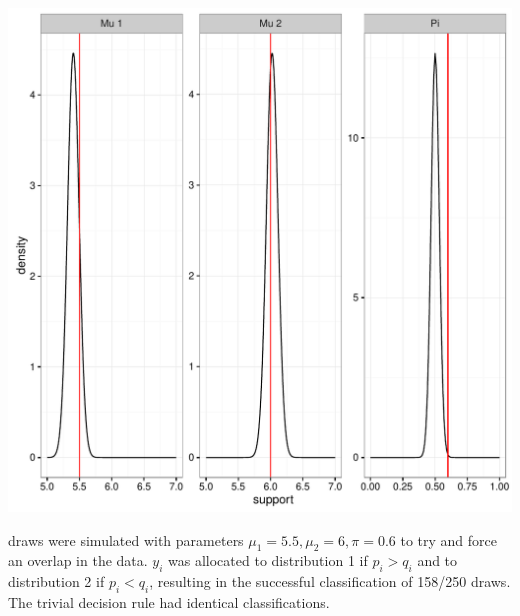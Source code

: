 \documentclass[12pt]{article}\usepackage[]{graphicx}\usepackage[]{color}
\makeatletter
\def\maxwidth{ %
  \ifdim\Gin@nat@width>\linewidth
    \linewidth
  \else
    \Gin@nat@width
  \fi
}
\newenvironment{knitrout}{}{} %
\makeatother
\begin{document}
\begin{knitrout}
\color{fgcolor}
\includegraphics[width=\maxwidth]{figure/vbayes2-1} 

\end{knitrout}
250 draws were simulated with parameters $\mu_1 = 5.5, \mu_2 = 6, \pi=0.6$ to try and force an overlap in the data. $y_i$ was allocated to distribution 1 if $p_i > q_i$ and to distribution 2 if $p_i < q_i$, resulting in the successful classification of 158/250 draws. The trivial decision rule had identical classifications.
\end{document}
